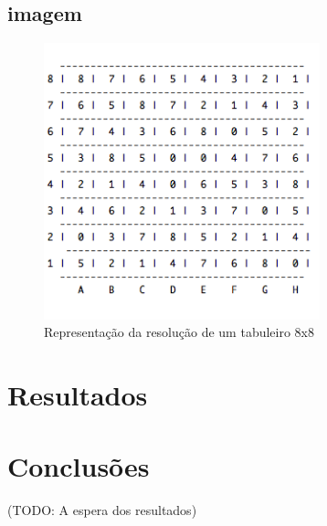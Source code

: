 \documentclass{llncs}
\begin{document}
\subsection*{imagem}
\begin{figure}[ht!]
\centering
\includegraphics[width=80mm]{tabuleiro.png}
\caption{Representação da resolução de um tabuleiro  8x8}
\label{representação do estado final de um tabuleiro 8x8}
\end{figure}









\section{Resultados}



\section{Conclus\~{o}es}

(TODO: A espera dos resultados)
\end{document}
